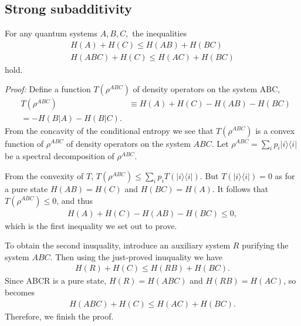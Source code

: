 \subsection{Strong subadditivity}\label{StrSubAdd}
For any quantum systems $A, B, C,$ the inequalities
\begin{align}
H(A)+H(C) \leq H(AB)+H(BC) \nonumber \\
H(ABC)+H(C) \leq H(AC)+H(BC)
\end{align}
hold.

\emph{Proof:} Define a function $T(\rho ^{ABC})$ of density operators on the system ABC,
\begin{align}
&T(\rho ^{ABC}) &\equiv H(A)+H(C)-H(AB)-H(BC) \nonumber \\
&= -H(B|A) -H(B|C).
\end{align}
From the concavity of the conditional entropy we see that $T(\rho ^{ABC})$ is a convex function of $\rho ^{ABC}$ of density operators on the system $ABC$.
Let $\rho ^{ABC} = \sum_ip_i|i \rangle \langle i|$ be a spectral decomposition of $\rho ^{ABC}$.

From the convexity of $T$, $T(\rho ^{ABC}) \leq \sum_ip_iT(|i \rangle \langle i|)$. But $T(|i \rangle \langle i|)=0$ as for a pure state $H(AB)=H(C)$ and $H(BC)=H(A)$. It follows that $T(\rho ^{ABC}) \leq 0$, and thus
\begin{align}
H(A)+H(C)-H(AB)-H(BC) \leq 0,
\end{align}
which is the first inequality we set out to prove.

To obtain the second inuquality, introduce an auxiliary system $R$ purifying the system $ABC$. Then using the just-proved inuquality we have
\begin{align}
H(R)+H(C) \leq H(RB)+H(BC).
\end{align}
Since ABCR is a pure state, $H(R)=H(ABC)$ and $H(RB)=H(AC)$, so becomes
\begin{align}
H(ABC)+H(C) \leq H(AC)+H(BC).
\end{align}
Therefore, we finish the proof.